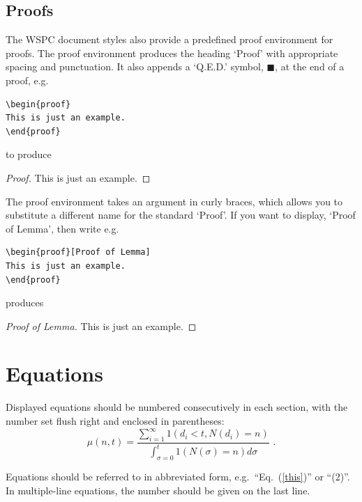 \documentclass{ws-ijbc}
\begin{document}
\subsection{Proofs}
The WSPC document styles also provide a predefined proof environment
for proofs. The proof \hbox{environment} produces the heading
`Proof' with appropriate spacing and punctuation. It also appends a
`Q.E.D.' symbol, $\blacksquare$, at the end of a proof, e.g.

\begin{verbatim}
\begin{proof}
This is just an example.
\end{proof}
\end{verbatim}

\noindent to produce

\begin{proof}
This is just an example.
\end{proof}

The proof environment takes an argument in curly
braces, which allows you to substitute a different name for the standard
`Proof'. If you want to display, `Proof of Lemma', then write e.g.

\begin{verbatim}
\begin{proof}[Proof of Lemma]
This is just an example.
\end{proof}
\end{verbatim}

\noindent produces

\begin{proof}[Proof of Lemma]
This is just an example.
\end{proof}

\section{Equations}
\noindent Displayed equations should be numbered consecutively in
each section, with the number set flush right and enclosed in
parentheses:
\begin{equation}
\mu(n, t) = \frac{\displaystyle\sum^\infty_{i=1} 1(d_i < t, N(d_i) = n)}
{\displaystyle\int^t_{\sigma=0} 1(N(\sigma) = n)d\sigma}\,\,
.\label{this}
\end{equation}

\noindent Equations should be referred to in abbreviated form,
e.g.~``Eq.~(\ref{this})'' or ``(2)''. In multiple-line equations,
the number should be given on the last line.
\end{document}
